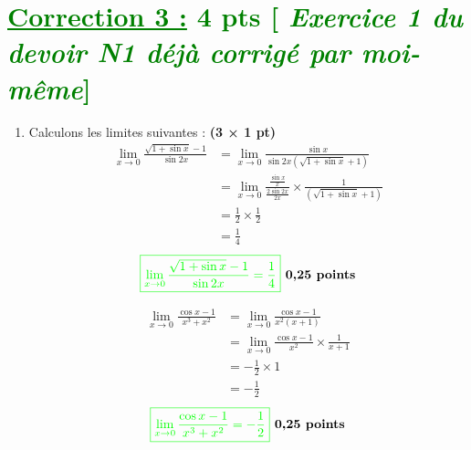 \documentclass[12pt,a4paper]{article}
\begin{document}
\section*{\textcolor{green}{\underline{Correction 3 :} 4 pts [\textit{ Exercice 1  du devoir N1 déjà  corrigé par moi-même}]}}
\begin{enumerate}
    \item Calculons les limites suivantes : \textbf{(3 × 1 pt)}
    \begin{align*}
    \lim_{x \to 0} \frac{\sqrt{1+\sin x} - 1}{\sin 2x}&=\lim_{x \to 0} \frac{\sin x }{\sin 2x\left( \sqrt{1+\sin x} + 1\right) }\\
    &=\lim_{x \to 0} \frac{\frac{\sin x}{x} }{\frac{2\sin 2x}{2x}}\times \frac{1}{\left(\sqrt{1+\sin x} + 1\right)}\\
    &=\frac{1}{2}\times\frac{1}{2}\\
    &=\frac{1}{4}
    \end{align*}
\[
\textcolor{green}{\boxed{ \lim_{x \to 0} \frac{\sqrt{1+\sin x} - 1}{\sin 2x}=\frac{1}{4}  }} \textbf{ 0,25 points}
\]

    \begin{align*}
    \lim_{x \to 0} \frac{\cos x - 1}{x^3 + x^2}&=\lim_{x \to 0}\frac{\cos x - 1}{x^2(x + 1)}\\
    &=\lim_{x \to 0} \frac{\cos x - 1}{x^{2}} \times \frac{1}{x+1}\\
    &=-\frac{1}{2}\times1\\
    &=-\frac{1}{2}
    \end{align*}
\[
\textcolor{green}{\boxed{ \lim_{x \to 0} \frac{\cos x - 1}{x^3 + x^2}=-\frac{1}{2}  }} \textbf{ 0,25 points}
\]


\end{enumerate}
\end{document}

